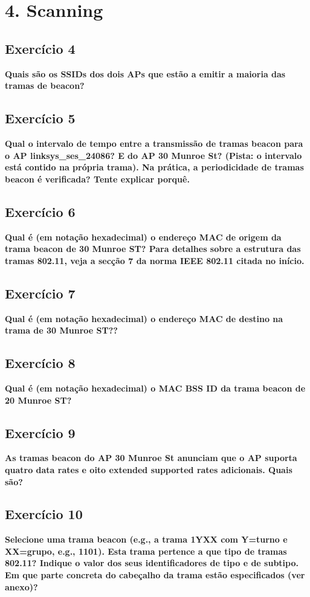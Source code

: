 \documentclass[a4paper]{report}
\begin{document}
\chapter{4. Scanning}
\section{Exercício 4}
\textbf{Quais são os SSIDs dos dois APs que estão a emitir a maioria das tramas
    de beacon?}

\section{Exercício 5}
\textbf{Qual o intervalo de tempo entre a transmissão de tramas beacon para o AP
    linksys\_ses\_24086? E do AP 30 Munroe St? (Pista: o intervalo está contido na
    própria trama). Na prática, a periodicidade de tramas beacon é verificada?
    Tente explicar porquê.}

\section{Exercício 6}
\textbf{Qual é (em notação hexadecimal) o endereço MAC de origem da trama beacon
    de 30 Munroe ST? Para detalhes sobre a estrutura das tramas 802.11, veja a
    secção 7 da norma IEEE 802.11 citada no início.}

\section{Exercício 7}
\textbf{Qual é (em notação hexadecimal) o endereço MAC de destino na trama de 30
    Munroe ST??}

\section{Exercício 8}
\textbf{Qual é (em notação hexadecimal) o MAC BSS ID da trama beacon de 20
    Munroe ST?}

\section{Exercício 9}
\textbf{As tramas beacon do AP 30 Munroe St anunciam que o AP suporta quatro
    data rates e oito extended supported rates adicionais. Quais são?}

\section{Exercício 10}
\textbf{Selecione uma trama beacon (e.g., a trama 1YXX com Y=turno e XX=grupo,
    e.g., 1101). Esta trama pertence a que tipo de tramas 802.11? Indique o
    valor dos seus identificadores de tipo e de subtipo. Em que parte concreta
    do cabeçalho da trama estão especificados (ver anexo)?}
\end{document}
